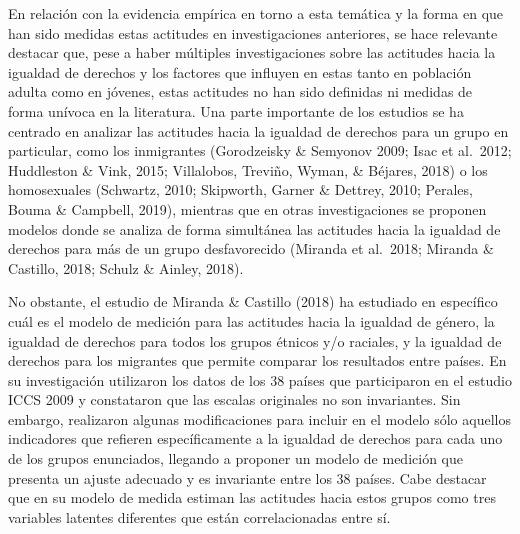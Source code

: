 \documentclass[12pt,twoside]{templates/facsothesis}
\begin{document}
En relación con la evidencia empírica en torno a esta temática y la forma en que han sido medidas estas actitudes en investigaciones anteriores, se hace relevante destacar que, pese a haber múltiples investigaciones sobre las actitudes hacia la igualdad de derechos y los factores que influyen en estas tanto en población adulta como en jóvenes, estas actitudes no han sido definidas ni medidas de forma unívoca en la literatura. Una parte importante de los estudios se ha centrado en analizar las actitudes hacia la igualdad de derechos para un grupo en particular, como los inmigrantes (Gorodzeisky \& Semyonov 2009; Isac et al.~2012; Huddleston \& Vink, 2015; Villalobos, Treviño, Wyman, \& Béjares, 2018) o los homosexuales (Schwartz, 2010; Skipworth, Garner \& Dettrey, 2010; Perales, Bouma \& Campbell, 2019), mientras que en otras investigaciones se proponen modelos donde se analiza de forma simultánea las actitudes hacia la igualdad de derechos para más de un grupo desfavorecido (Miranda et al.~2018; Miranda \& Castillo, 2018; Schulz \& Ainley, 2018).

No obstante, el estudio de Miranda \& Castillo (2018) ha estudiado en específico cuál es el modelo de medición para las actitudes hacia la igualdad de género, la igualdad de derechos para todos los grupos étnicos y/o raciales, y la igualdad de derechos para los migrantes que permite comparar los resultados entre países. En su investigación utilizaron los datos de los 38 países que participaron en el estudio ICCS 2009 y constataron que las escalas originales no son invariantes. Sin embargo, realizaron algunas modificaciones para incluir en el modelo sólo aquellos indicadores que refieren específicamente a la igualdad de derechos para cada uno de los grupos enunciados, llegando a proponer un modelo de medición que presenta un ajuste adecuado y es invariante entre los 38 países. Cabe destacar que en su modelo de medida estiman las actitudes hacia estos grupos como tres variables latentes diferentes que están correlacionadas entre sí.
\end{document}
